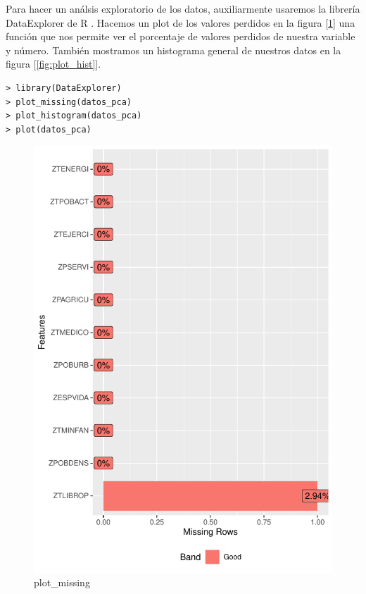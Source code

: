 \documentclass[12pt,twoside]{report}
\begin{document}
Para hacer un análsis exploratorio de los datos, auxiliarmente usaremos la librería DataExplorer de R \cite{data-explorer}. Hacemos un plot de los valores perdidos en la figura [\ref{fig:plot_missing}] una función que nos permite ver el porcentaje de valores perdidos de nuestra variable y número. También mostramos un histograma general de nuestros datos en la figura [\ref{fig:plot_hist}]. 

 \begin{lstlisting}
> library(DataExplorer)
> plot_missing(datos_pca)
> plot_histogram(datos_pca)
> plot(datos_pca)
\end{lstlisting}

\begin{figure}[H]
\includegraphics[width=\textwidth]{../code/figures/plot_missing.pdf}
\caption{plot\_missing}
\label{fig:plot_missing}
\end{figure} 
\end{document}
